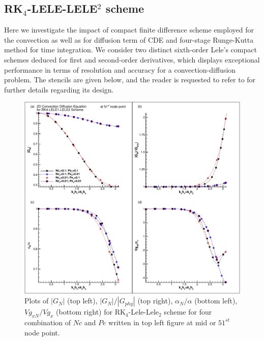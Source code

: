 \documentclass[showpacs,preprintnumbers,amsmath,amssymb]{revtex4-1} %
\begin{document}

\subsection{RK$_4$-LELE-LELE$^2$ scheme}

Here we investigate the impact of compact finite difference scheme employed for the convection as well as for diffusion term of CDE and four-stage Runge-Kutta method for time integration. We consider two distinct sixth-order Lele's compact schemes deduced for first and second-order derivatives, which displays exceptional performance in terms of resolution and accuracy for a convection-diffusion problem. The stencils are given below, and the reader is requested to refer to \cite{LELE1992} for further details regarding its design.

\begin{figure}
\begin{center}
\includegraphics[width=150mm]{prop_RK4_LELE_LELE.pdf}
\end{center}
\raggedleft
\caption{Plots of $|G_N|$ (top left), $|G_N|/|G_{phy}|$ (top right), $\alpha_N/\alpha$ (bottom left), $Vg_{xN}/Vg_x$ (bottom right) for RK$_4$-Lele-Lele$_2$ scheme for four combination of $Nc$ and $Pe$ written in top left figure at mid or $51^{st}$ node point.}
\label{fig_LELE_2}
\end{figure}
\end{document}
